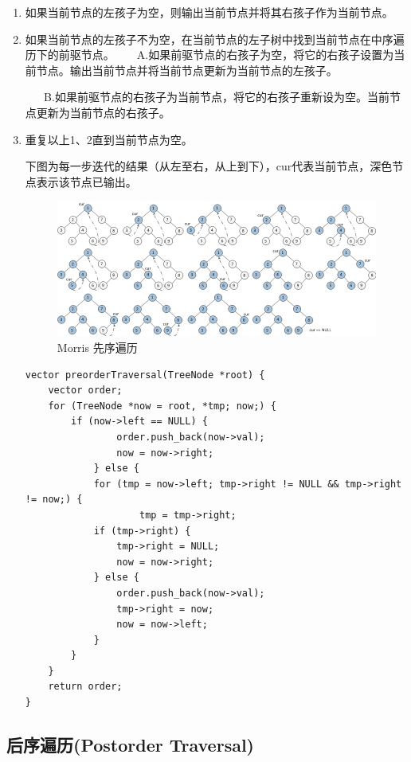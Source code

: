 \documentclass[12pt]{book}
\begin{document}
\begin{enumerate}
\item 如果当前节点的左孩子为空，则输出当前节点并将其右孩子作为当前节点。
\label{sec-4-1-2-1}
\item 如果当前节点的左孩子不为空，在当前节点的左子树中找到当前节点在中序遍历下的前驱节点。
\label{sec-4-1-2-2}
~ ~ A.如果前驱节点的右孩子为空，将它的右孩子设置为当前节点。输出当前节点并将当前节点更新为当前节点的左孩子。

~ ~ B.如果前驱节点的右孩子为当前节点，将它的右孩子重新设为空。当前节点更新为当前节点的右孩子。
\item 重复以上1、2直到当前节点为空。
\label{sec-4-1-2-3}

下图为每一步迭代的结果（从左至右，从上到下），cur代表当前节点，深色节
点表示该节点已输出。

\begin{figure}[htb]
\centering
\includegraphics[width=.9\linewidth]{./pic/morrPre.jpg}
\caption{Morris 先序遍历}
\end{figure}

\lstset{language=java,label= ,caption= ,numbers=none}
\begin{lstlisting}
vector preorderTraversal(TreeNode *root) {
	vector order;
	for (TreeNode *now = root, *tmp; now;) {
	    if (now->left == NULL) {
                order.push_back(now->val);
                now = now->right;   
            } else {
	        for (tmp = now->left; tmp->right != NULL && tmp->right != now;) {
                    tmp = tmp->right;
	        if (tmp->right) {
				tmp->right = NULL;
				now = now->right;
	        } else {
				order.push_back(now->val);
				tmp->right = now;
				now = now->left;
	        }
	    }
	}
	return order;
}
\end{lstlisting}
\end{enumerate}

\subsection{后序遍历(Postorder Traversal)}
\label{sec-4-1-3}
\end{document}
